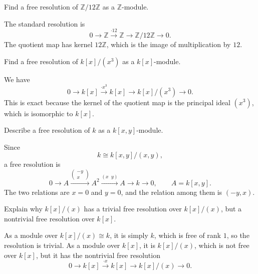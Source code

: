 \begin{problem}[CP-V-0077]
\label{prob:cp-v-0077}
Find a free resolution of \(\mathbb Z/12\mathbb Z\) as a \(\mathbb Z\)-module.
\end{problem}

\begin{solution}
The standard resolution is
\[
0 \longrightarrow \mathbb Z \xrightarrow{\cdot 12} \mathbb Z \longrightarrow \mathbb Z/12\mathbb Z \longrightarrow 0.
\]
The quotient map has kernel \(12\mathbb Z\), which is the image of multiplication by \(12\).
\end{solution}


\begin{problem}[CP-V-0078]
\label{prob:cp-v-0078}
Find a free resolution of \(k[x]/(x^3)\) as a \(k[x]\)-module.
\end{problem}

\begin{solution}
We have
\[
0 \longrightarrow k[x] \xrightarrow{\cdot x^3} k[x] \longrightarrow k[x]/(x^3) \longrightarrow 0.
\]
This is exact because the kernel of the quotient map is the principal ideal \((x^3)\), which is isomorphic to \(k[x]\).
\end{solution}


\begin{problem}[CP-V-0079]
\label{prob:cp-v-0079}
Describe a free resolution of \(k\) as a \(k[x,y]\)-module.
\end{problem}

\begin{solution}
Since
\[
k \cong k[x,y]/(x,y),
\]
a free resolution is
\[
0 \longrightarrow A \xrightarrow{\begin{pmatrix}-y\\x\end{pmatrix}} A^2
\xrightarrow{(x\;\;y)} A \longrightarrow k \longrightarrow 0,
\qquad A=k[x,y].
\]
The two relations are \(x=0\) and \(y=0\), and the relation among them is \((-y,x)\).
\end{solution}


\begin{problem}[CP-V-0082]
\label{prob:cp-v-0082}
Explain why \(k[x]/(x)\) has a trivial free resolution over \(k[x]/(x)\), but a nontrivial free resolution over \(k[x]\).
\end{problem}

\begin{solution}
As a module over \(k[x]/(x)\cong k\), it is simply \(k\), which is free of rank \(1\), so the resolution is trivial.
As a module over \(k[x]\), it is \(k[x]/(x)\), which is not free over \(k[x]\), but it has the nontrivial free resolution
\[
0 \longrightarrow k[x] \xrightarrow{\cdot x} k[x] \longrightarrow k[x]/(x) \longrightarrow 0.
\]
\end{solution}



